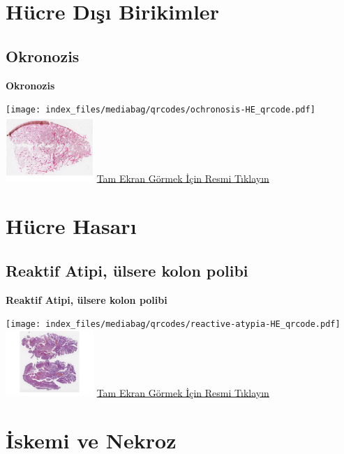 \documentclass[
  letterpaper,
  DIV=11,
  numbers=noendperiod]{scrreprt}
\begin{document}
\chapter{Hücre Dışı Birikimler}\label{sec-hucre-disi-birikimler}

\section{Okronozis}\label{sec-okronozis}

\textbf{Okronozis}

\texttt{[image: index\_files/mediabag/qrcodes/ochronosis-HE\_qrcode.pdf]}
\href{https://images.patolojiatlasi.com/ochronosis/HE.html}{\includegraphics[width=0.25\textwidth,height=\textheight]{./screenshots/thumbnail_ochronosis.png}}
\href{https://images.patolojiatlasi.com/ochronosis/HE.html}{Tam Ekran
Görmek İçin Resmi Tıklayın}

\chapter{Hücre Hasarı}\label{sec-hucre-hasari}

\section{Reaktif Atipi, ülsere kolon polibi}\label{sec-reaktif-atipi}

\textbf{Reaktif Atipi, ülsere kolon polibi}

\texttt{[image: index\_files/mediabag/qrcodes/reactive-atypia-HE\_qrcode.pdf]}
\href{https://images.patolojiatlasi.com/reactive-atypia/HE.html}{\includegraphics[width=0.25\textwidth,height=\textheight]{./screenshots/thumbnail_reactive-atypia.png}}
\href{https://images.patolojiatlasi.com/reactive-atypia/HE.html}{Tam
Ekran Görmek İçin Resmi Tıklayın}

\chapter{İskemi ve Nekroz}\label{sec-iskemi-ve-nekroz}
\end{document}
